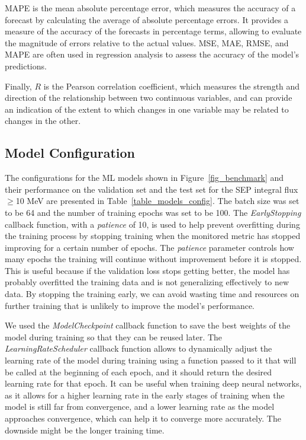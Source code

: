MAPE is the mean absolute percentage error, which measures the accuracy of a forecast by calculating the average of absolute percentage errors. It provides a measure of the accuracy of the forecasts in percentage terms, allowing to evaluate the magnitude of errors relative to the actual values.
MSE, MAE, RMSE, and MAPE are often used in regression analysis to assess the accuracy of the model's predictions.

Finally, $R$ is the Pearson correlation coefficient, which measures the strength and direction of the relationship between two continuous variables, and can provide an indication of the extent to which changes in one variable may be related to changes in the other.

\subsection{Model Configuration}
\label{config_appendix}
The configurations for the ML models shown in Figure~\ref{fig_benchmark} and their performance on the validation set and the test set for the SEP integral flux $\geq$10 MeV are presented in Table~\ref{table_models_config}.
The batch size was set to be 64 and the number of training epochs was set to be 100. 
The \textit{EarlyStopping} callback function, with a \textit{patience} of 10, is used to help prevent overfitting during the training process by stopping training when the monitored metric has stopped improving for a certain number of epochs.
The \textit{patience} parameter controls how many epochs the training will continue without improvement before it is stopped. This is useful because if the validation loss stops getting better, the model has probably overfitted the training data and is not generalizing effectively to new data. By stopping the training early, we can avoid wasting time and resources on further training that is unlikely to improve the model's performance.

We used the \textit{ModelCheckpoint} callback function to save the best weights of the model during training so that they can be reused later.
The \textit{LearningRateScheduler} callback function allows to dynamically adjust the learning rate of the model during training using a function passed to it that will be called at the beginning of each epoch, and it should return the desired learning rate for that epoch. It can be useful when training deep neural networks, as it allows for a higher learning rate in the early stages of training when the model is still far from convergence, and a lower learning rate as the model approaches convergence, which can help it to converge more accurately. The downside might be the longer training time.

